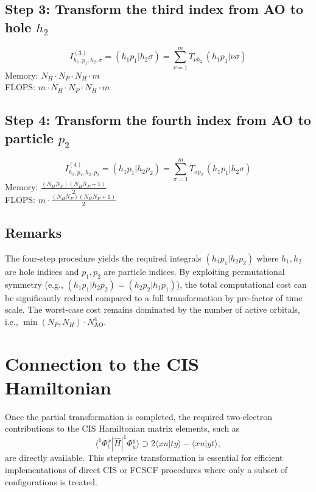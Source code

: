 \documentclass[12pt]{article}
\begin{document}
\subsection{Step 3: Transform the third index from AO to hole \(h_2\)}
\[
I^{(3)}_{h_1,p_1,h_2,\sigma} = (h_1 p_1|h_2\sigma) = \sum_{\nu=1}^{m} T_{\nu h_2}\, (h_1 p_1|\nu\sigma)
\]
Memory: \(N_H \cdot N_P \cdot N_H \cdot m\) \\
FLOPS: \(m \cdot N_H \cdot N_P \cdot N_H \cdot m\)

\subsection{Step 4: Transform the fourth index from AO to particle \(p_2\)}
\[
I^{(4)}_{h_1,p_1,h_2,p_2} = (h_1 p_1|h_2 p_2) = \sum_{\sigma=1}^{m} T_{\sigma p_2}\, (h_1 p_1|h_2\sigma)
\]
Memory: \(\frac{(N_H N_P)(N_H N_P+1)}{2}\) \\
FLOPS: \(m \cdot \frac{(N_H N_P)(N_H N_P+1)}{2}\)

\subsection{Remarks}
The four-step procedure yields the required integrals \((h_1 p_1|h_2 p_2)\) where \(h_1, h_2\) are hole indices and \(p_1, p_2\) are particle indices. By exploiting permutational symmetry (e.g., \((h_1 p_1|h_2 p_2) = (h_2 p_2|h_1 p_1)\)), the total computational cost can be significantly reduced compared to a full transformation by pre-factor of time scale. The worst-case cost remains dominated by the number of active orbitals, i.e., \(\min(N_P, N_H) \cdot N_{\text{AO}}^4\).

\section{Connection to the CIS Hamiltonian}

Once the partial transformation is completed, the required two-electron contributions to the CIS Hamiltonian matrix elements, such as
\[
\langle ^1\Phi_t^x | \hat{H} | ^1\Phi_u^y \rangle \supset 2\langle x u|t y\rangle - \langle x u|y t\rangle,
\]
are directly available. This stepwise transformation is essential for efficient implementations of direct CIS or FCSCF procedures where only a subset of configurations is treated.
\end{document}

